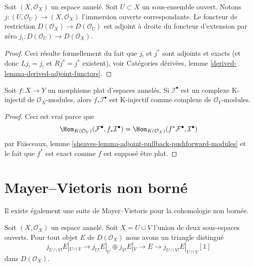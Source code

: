 \begin{lemma}

\label{lemma-adjoint-lower-shriek-restrict}
Soit $(X, \mathcal{O}_X)$ un espace annelé. Soit $U \subset X$ un sous-ensemble ouvert. Notons $j : (U, \mathcal{O}_U) \to (X, \mathcal{O}_X)$ l'immersion ouverte correspondante. Le foncteur de restriction $D(\mathcal{O}_X) \to D(\mathcal{O}_U)$ est adjoint à droite du foncteur d'extension par zéro $j_! : D(\mathcal{O}_U) \to D(\mathcal{O}_X)$.
\end{lemma}

\begin{proof}
Ceci résulte formellement du fait que $j_!$ et $j^*$ sont adjoints et exacts (et donc $Lj_! = j_!$ et $Rj^* = j^*$ existent), voir Catégories dérivées, lemme \ref{derived-lemma-derived-adjoint-functors}.
\end{proof}

\begin{lemma}

\label{lemma-K-injective-flat}

Soit $f : X \to Y$ un morphisme plat d'espaces annelés. Si $\mathcal{I}^\bullet$ est un complexe K-injectif de $\mathcal{O}_X$-modules, alors $f_*\mathcal{I}^\bullet$ est K-injectif comme complexe de
$\mathcal{O}_Y$-modules.

\end{lemma}

\begin{proof}
Ceci est vrai parce que $$
\Hom_{K(\mathcal{O}_Y)}(\mathcal{F}^\bullet, f_*\mathcal{I}^\bullet)
=
\Hom_{K(\mathcal{O}_X)}(f^*\mathcal{F}^\bullet, \mathcal{I}^\bullet)
$$ par Faisceaux, lemme \ref{sheaves-lemma-adjoint-pullback-pushforward-modules} et le fait que $f^*$ est exact comme $f$ est supposé être plat.
\end{proof}





\section{Mayer--Vietoris non borné}

\label{section-unbounded-mayer-vietoris}

\noindent
Il existe également une suite de Mayer--Vietoris pour la cohomologie non bornée.

\begin{lemma}

\label{lemma-exact-sequence-lower-shriek}
Soit $(X, \mathcal{O}_X)$ un espace annelé. Soit $X = U \cup V$ l'union de deux sous-espaces ouverts. Pour tout objet $E$ de $D(\mathcal{O}_X)$ nous avons un triangle distingué $$
j_{U \cap V!}E|_{U \cap V} \to
j_{U!}E|_U \oplus j_{V!}E|_V \to E \to 
j_{U \cap V!}E|_{U \cap V}[1]
$$ dans $D(\mathcal{O}_X)$.
\end{lemma}

